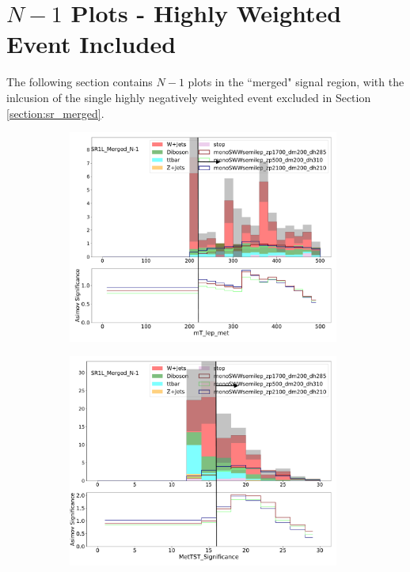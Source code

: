 \FloatBarrier
\section{$N-1$ Plots - Highly Weighted Event Included}
\label{section:N1_backup}
The following section contains $N-1$ plots in the ``merged" signal region, with the inlcusion of the single highly negatively weighted event excluded in Section \ref{section:sr_merged}.
\begin{figure}[htbp]
  \centering

     \begin{subfigure}{0.49\textwidth}
     \includegraphics[width = 0.98\textwidth]{Figures/4/N1n/mT_lep_met.pdf}
     \caption{\mtlepmet}
     \end{subfigure}
     \begin{subfigure}{0.49\textwidth}
     \includegraphics[width = 0.98\textwidth]{Figures/4/N1n/MetTST_Significance.pdf}

\end{subfigure}
\end{figure}
